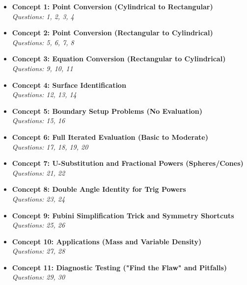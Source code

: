 \documentclass[12pt]{article}
\begin{document}
\begin{itemize}
    \item \textbf{Concept 1: Point Conversion (Cylindrical to Rectangular)} \\ \textit{Questions: 1, 2, 3, 4}
    \item \textbf{Concept 2: Point Conversion (Rectangular to Cylindrical)} \\ \textit{Questions: 5, 6, 7, 8}
    \item \textbf{Concept 3: Equation Conversion (Rectangular to Cylindrical)} \\ \textit{Questions: 9, 10, 11}
    \item \textbf{Concept 4: Surface Identification} \\ \textit{Questions: 12, 13, 14}
    \item \textbf{Concept 5: Boundary Setup Problems (No Evaluation)} \\ \textit{Questions: 15, 16}
    \item \textbf{Concept 6: Full Iterated Evaluation (Basic to Moderate)} \\ \textit{Questions: 17, 18, 19, 20}
    \item \textbf{Concept 7: U-Substitution and Fractional Powers (Spheres/Cones)} \\ \textit{Questions: 21, 22}
    \item \textbf{Concept 8: Double Angle Identity for Trig Powers} \\ \textit{Questions: 23, 24}
    \item \textbf{Concept 9: Fubini Simplification Trick and Symmetry Shortcuts} \\ \textit{Questions: 25, 26}
    \item \textbf{Concept 10: Applications (Mass and Variable Density)} \\ \textit{Questions: 27, 28}
    \item \textbf{Concept 11: Diagnostic Testing ("Find the Flaw" and Pitfalls)} \\ \textit{Questions: 29, 30}
\end{itemize}
\end{document}
